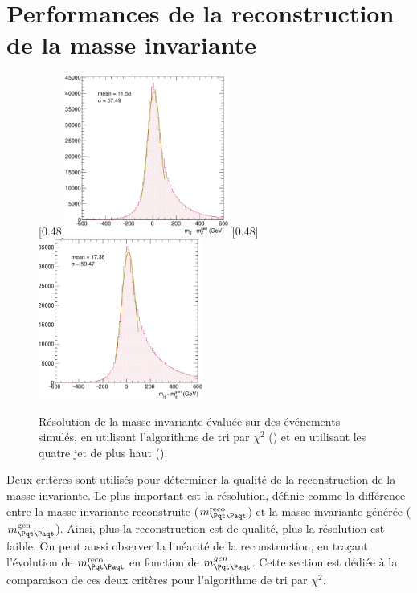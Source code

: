 \section{Performances de la reconstruction de la masse invariante} \label{sec:perf_reco_tt}

\begin{figure}[tbp] \centering
    \subcaptionbox{\label{fig:mtt_reso_chi2}}[0.48\textwidth]{\includegraphics[width=0.48\textwidth]{chapitre6/figs/mtt_resolution_chi2.pdf}} \hfill
    \subcaptionbox{\label{fig:mtt_reso_four_jets}}[0.48\textwidth]{\includegraphics[width=0.48\textwidth]{chapitre6/figs/mtt_resolution_four_jets.pdf}}
    \caption{Résolution de la masse invariante \mtt évaluée sur des événements \ttbar simulés, en utilisant l'algorithme de tri par $\chi^2$ () et en utilisant les quatre jet de plus haut \pt ().}
\end{figure}

Deux critères sont utilisés pour déterminer la qualité de la reconstruction de la masse invariante. Le plus important est la résolution, définie comme la différence entre la masse invariante reconstruite ($\mtt^\text{reco}$) et la masse invariante générée ($\mtt^\text{gen}$). Ainsi, plus la reconstruction est de qualité, plus la résolution est faible. On peut aussi observer la linéarité de la reconstruction, en traçant l'évolution de $\mtt^\text{reco}$ en fonction de $\mtt^{gen}$. Cette section est dédiée à la comparaison de ces deux critères pour l'algorithme de tri par $\chi^2$.

